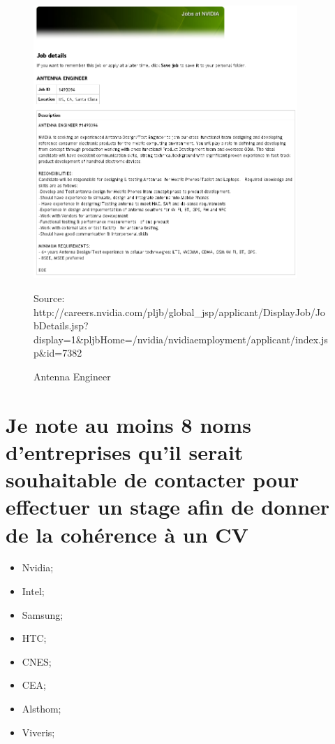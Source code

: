 \documentclass[10pt]{article}
\begin{document}
\begin{figure}
    \begin{center}
        \includegraphics[width=10cm]{antenne}
    \end{center}
    \caption{Antenna Engineer}
    Source: http://careers.nvidia.com/pljb/global\_jsp/applicant/DisplayJob/JobDetails.jsp?display=1\&pljbHome=/nvidia/nvidiaemployment/applicant/index.jsp\&id=7382
\end{figure}

\section{Je note au moins 8 noms d’entreprises qu’il serait souhaitable de contacter pour effectuer un stage afin de
donner de la cohérence à un CV}
\begin{itemize}
    \item Nvidia;
    \item Intel;
    \item Samsung;
    \item HTC;
    \item CNES;
    \item CEA;
    \item Alsthom;
    \item Viveris;
\end{itemize}
\end{document}
